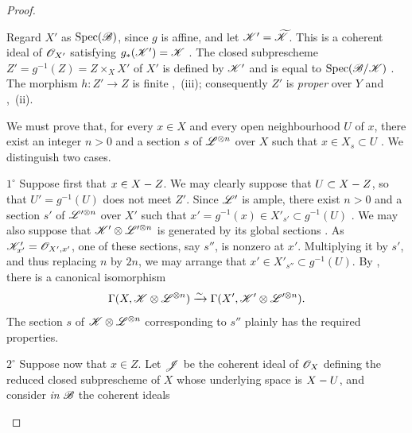 \begin{proof}
\begin{env}[2.6.2.5]
\label{III.2.6.2.5}
Regard $X'$ as $\operatorname{Spec}(\mathscr{B})$, since $g$ is affine, and let $\mathscr{K}'=\widetilde{\mathscr{K}}$.
This is a coherent ideal of $\mathscr{O}_{X'}$ satisfying
$g_*(\mathscr{K}')=\mathscr{K}$ .
The closed subprescheme $Z'=g^{-1}(Z)=Z\times_X X'$
of $X'$ is defined by $\mathscr{K}'$ and is equal to $\operatorname{Spec}(\mathscr{B}/\mathscr{K})$
.
The morphism $h:Z'\to Z$ is finite ,~(iii);
consequently $Z'$ is \emph{proper} over $Y$  and
,~(ii).

We must prove that, for every $x\in X$ and every open neighbourhood $U$
of $x$, there exist an integer $n>0$ and a section $s$ of
$\mathscr{L}^{\otimes n}$ over $X$ such that $x\in X_s\subset U$
.
We distinguish two cases.

\smallskip
\noindent
$1^\circ$ Suppose first that $x\in X- Z$.
We may clearly suppose that $U\subset X- Z$, so that
$U'=g^{-1}(U)$ does not meet $Z'$.
Since $\mathscr{L}'$ is ample, there exist $n>0$ and a section $s'$ of
$\mathscr{L}'^{\otimes n}$ over $X'$ such that $x'=g^{-1}(x)\in X'_{s'}\subset g^{-1}(U)$
.
We may also suppose that
$\mathscr{K}'\otimes\mathscr{L}'^{\otimes n}$ is generated by its global sections
.
As $\mathscr{K}'_{x'}=\mathscr{O}_{X',x'}$, one of these sections, say $s''$, is
nonzero at $x'$.
Multiplying it by $s'$, and thus replacing $n$ by $2n$, we may arrange
that $x'\in X'_{s''}\subset g^{-1}(U)$.
By , there is a canonical isomorphism
\[
  \Gamma(X,\mathscr{K}\otimes\mathscr{L}^{\otimes n})
  \xrightarrow{\sim}
  \Gamma(X',\mathscr{K}'\otimes\mathscr{L}'^{\otimes n}).
\]
The section $s$ of $\mathscr{K}\otimes\mathscr{L}^{\otimes n}$ corresponding to
$s''$ plainly has the required properties.

\smallskip
\noindent
$2^\circ$ Suppose now that $x\in Z$.
Let $\mathscr{J}$ be the coherent ideal of $\mathscr{O}_X$ defining the reduced
closed subprescheme of $X$ whose underlying space is $X- U$, and consider \emph{in}
$\mathscr{B}$ the coherent ideals



\end{env}
\end{proof}
